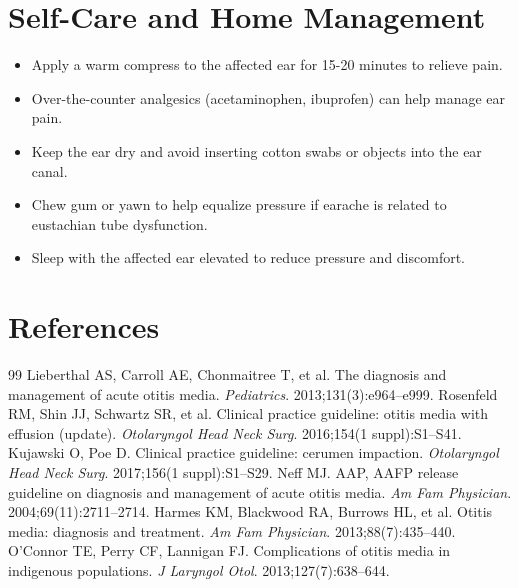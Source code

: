 \section*{Self-Care and Home Management}
\begin{itemize}
  \item Apply a warm compress to the affected ear for 15-20 minutes to relieve pain.
  \item Over-the-counter analgesics (acetaminophen, ibuprofen) can help manage ear pain.
  \item Keep the ear dry and avoid inserting cotton swabs or objects into the ear canal.
  \item Chew gum or yawn to help equalize pressure if earache is related to eustachian tube dysfunction.
  \item Sleep with the affected ear elevated to reduce pressure and discomfort.
\end{itemize}

\section*{References}
\begin{thebibliography}{99}
Lieberthal AS, Carroll AE, Chonmaitree T, et al. The diagnosis and management of acute otitis media. \textit{Pediatrics}. 2013;131(3):e964--e999.
Rosenfeld RM, Shin JJ, Schwartz SR, et al. Clinical practice guideline: otitis media with effusion (update). \textit{Otolaryngol Head Neck Surg}. 2016;154(1 suppl):S1--S41.
Kujawski O, Poe D. Clinical practice guideline: cerumen impaction. \textit{Otolaryngol Head Neck Surg}. 2017;156(1 suppl):S1--S29.
Neff MJ. AAP, AAFP release guideline on diagnosis and management of acute otitis media. \textit{Am Fam Physician}. 2004;69(11):2711--2714.
Harmes KM, Blackwood RA, Burrows HL, et al. Otitis media: diagnosis and treatment. \textit{Am Fam Physician}. 2013;88(7):435--440.
O'Connor TE, Perry CF, Lannigan FJ. Complications of otitis media in indigenous populations. \textit{J Laryngol Otol}. 2013;127(7):638--644.
\end{thebibliography}
